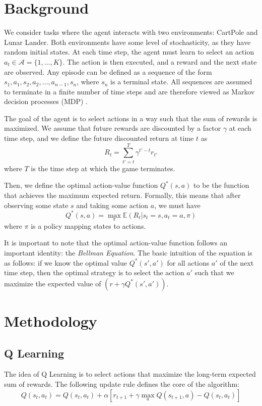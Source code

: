 \documentclass{article}
\newcommand{\e}[1]{\mathbb{E}(#1)}
\begin{document}
\section{Background}

We consider tasks where the agent interacts with two environments: CartPole and
Lunar Lander. Both environments have some level of stochasticity, as they have
random initial states. At each time step, the agent must learn to select an
action \(a_t \in \mathcal{A} = \{1, \hdots, K\}\). The action is then executed,
and a reward and the next state are observed. Any episode can be defined as a
sequence of the form \(s_1, a_1, s_2, a_2, \hdots, a_{n-1}, s_n\), where
\(s_n\) is a terminal state. All sequences are assumed to terminate in a finite
number of time steps and are therefore viewed as Markov decision processes
(MDP) \cite{DBLP:journals/corr/MnihKSGAWR13}.

The goal of the agent is to select actions in a way such that the sum of
rewards is maximized. We assume that future rewards are discounted by a factor
\(\gamma\) at each time step, and we define the future discounted return at
time \(t\) as
\begin{equation}
      R_t = \sum_{t' = t}^{T} \gamma^{t' - t}r_{t'}
      \label{eq:discounted_return}
\end{equation}
where \(T\) is
the time step at which the game terminates.

Then, we define the optimal action-value function \(Q^*(s,a)\) to be the
function that achieves the maximum expected return. Formally, this means that
after observing some state \(s\) and taking some action \(a\), we must have
\begin{equation}
      Q^*(s,a) = \max_\pi \e{R_t | s_t = s, a_t = a, \pi}
\end{equation}
where \(\pi\) is a policy mapping states to actions.

It is important to note that the optimal action-value function follows an
important identity: the \emph{Bellman Equation}. The basic intuition of the
equation is as follows: if we know the optimal value \(Q^*(s',a')\) for all
actions \(a'\) of the next time step, then the optimal strategy is to select
the action \(a'\) such that we maximize the expected value of \((r + \gamma
Q^*(s',a'))\).

\section{Methodology}
\subsection{Q Learning}
The idea of Q Learning is to select actions that maximize the long-term
expected sum of rewards. The following update rule defines the core of the
algorithm:
\begin{equation}
      Q(s_t, a_t) = Q(s_t, a_t) + \alpha \left[r_{t+1} + \gamma \max_{a} Q(s_{t+1}, a) - Q(s_t, a_t)\right]
      \label{eq:q_update_rule}
\end{equation}
\end{document}
